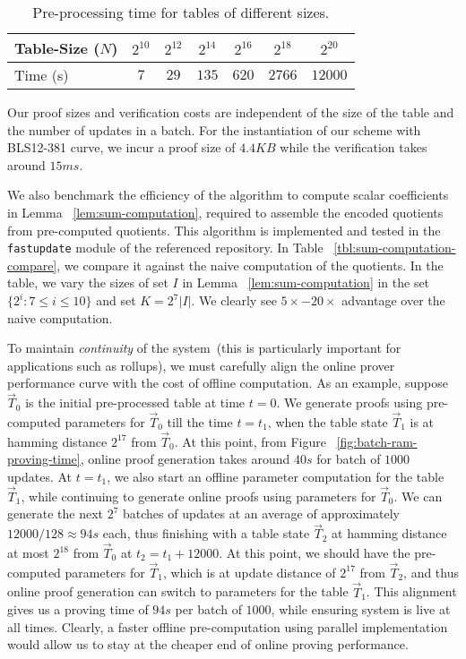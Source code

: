 \begin{table}[htbp]
    \begin{tabular}{|l|c|c|c|c|c|c|}
        \hline
        \cellcolor{gray} Table-Size ($N$) & $2^{10}$ & $2^{12}$ & $2^{14}$ & $2^{16}$ & $2^{18}$ & $2^{20}$ \\ \hline
        \cellcolor{gray} Time (s) & $7$ & $29$ & $135$ & $620$ & $2766$ & $12000$ \\ \hline
    \end{tabular}
    \caption{Pre-processing time for tables of different sizes.}
    \label{tbl:offline-proving-time}
\end{table}


 Our proof sizes and verification costs are independent of the
size of the table and the number of updates in a batch. For the instantiation of our scheme with BLS12-381 curve,
we incur a proof size of $4.4KB$ while the verification takes around $15ms$.

 We also benchmark the efficiency of the algorithm to compute
 scalar coefficients in Lemma ~\ref{lem:sum-computation}, required to assemble the encoded quotients from pre-computed quotients.
This algorithm is implemented and tested in the {\tt fastupdate} module of the referenced repository.
In Table ~\ref{tbl:sum-computation-compare}, we compare it against the naive computation of the quotients.
In the table, we vary the sizes of set $I$ in Lemma ~\ref{lem:sum-computation} in the set $\{2^i:7\leq i\leq 10\}$
and set $K=2^7|I|$. %
We clearly see $5\times-20\times$ advantage over the naive computation.

 To maintain {\em continuity} of the system~(this is particularly important for applications such as rollups), we must carefully
align the online prover performance curve with the cost of offline computation.  As an example, suppose $\vec{T}_0$
is the initial pre-processed table at time $t=0$. We generate proofs using pre-computed parameters for $\vec{T}_0$
till the time $t=t_1$, when the table state $\vec{T}_1$ is at hamming distance $2^{17}$ from $\vec{T}_0$. At this point,
from Figure ~\ref{fig:batch-ram-proving-time}, online proof generation takes around $40s$ for batch of $1000$ updates.
At $t=t_1$, we also start an offline parameter computation for the table $\vec{T}_1$, while continuing to generate
online proofs using parameters for $\vec{T}_0$. We can generate the next $2^7$ batches of updates at an average of
approximately $12000/128\approx 94s$ each, thus finishing with a table state $\vec{T}_2$ at hamming distance at most
$2^{18}$ from $\vec{T}_0$ at $t_2=t_1+12000$. At this point, we should have the pre-computed parameters for $\vec{T}_1$,
which is at update distance of $2^{17}$ from $\vec{T}_2$, and thus online proof generation can switch to parameters
for the table $\vec{T}_1$. This alignment gives us a proving time of $94s$ per batch of $1000$, while ensuring system
is live at all times. Clearly, a faster offline pre-computation using parallel implementation would allow us to stay
at the cheaper end of online proving performance.


